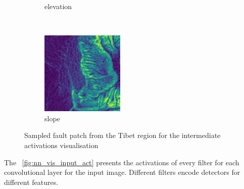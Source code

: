\documentclass[11pt,a4paper]{article}
\begin{document}
\begin{figure}[t]
\begin{subfigure}[b]{0.12\textwidth}
        \caption{elevation}
    \end{subfigure}
    ~
    \begin{subfigure}[b]{0.12\textwidth}
        \includegraphics[width=\textwidth]{graphics/nn_visualisation/input_image_4.png}
        \caption{slope}
    \end{subfigure}

    \caption{Sampled fault patch from the Tibet region for the intermediate activations visualisation}
    \label{fig:nn_vis_input}
\end{figure}

The \figurename~\ref{fig:nn_vis_input_act} presents the activations of every filter for each convolutional layer for the
input image. Different filters encode detectors for different features.
\end{document}
